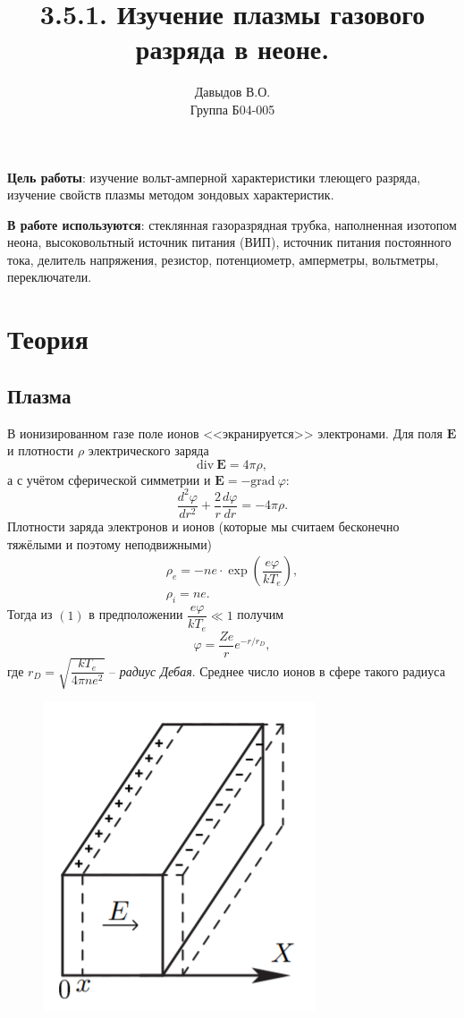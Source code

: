 \documentclass[a4paper,12pt]{article}
\author{Давыдов В.О.\\
Группа Б04-005}
\title{3.5.1. Изучение плазмы газового разряда в неоне.}
\date{}
\begin{document}
\maketitle
\textbf{Цель работы}: изучение вольт-амперной характеристики тлеющего разряда, изучение свойств плазмы методом зондовых характеристик.


\textbf{В работе используются}: стеклянная газоразрядная трубка, наполненная изотопом неона, высоковольтный источник питания (ВИП), источник питания постоянного тока, делитель напряжения, резистор, потенциометр, амперметры, вольтметры, переключатели.
\section*{Теория}
\subsection*{Плазма}
В ионизированном газе поле ионов <<экранируется>> электронами. Для поля $\mathbf{E}$ и плотности $\rho$ электрического заряда
$$
\text{div}~\mathbf{E} = 4 \pi \rho,
$$
а с учётом сферической симметрии и $\mathbf{E} = -\text{grad}~\varphi$:
\begin{equation}
\dfrac{d^2 \varphi}{dr^2}+\dfrac{2}{r}\dfrac{d\varphi}{dr}=-4\pi \rho.
\end{equation}
Плотности заряда электронов и ионов (которые мы считаем бесконечно тяжёлыми и поэтому неподвижными)
\begin{equation}
\begin{array}{c}
\rho_e = -ne \cdot \exp\left(\dfrac{e\varphi}{kT_e}\right),\\
\rho_i = ne.
\end{array}
\end{equation}
Тогда из $(1)$ в предположении $\dfrac{e\varphi}{kT_e} \ll 1$ получим
\begin{equation}
\varphi = \dfrac{Ze}{r}e^{-r/r_D},
\end{equation}
где $r_D = \sqrt{\dfrac{kT_e}{4\pi n e^2}}$ -- \textit{радиус Дебая}. Среднее число ионов в сфере такого радиуса 
\begin{figure}
\includegraphics[scale=0.5]{2.png}
\end{figure}  
\end{document}
